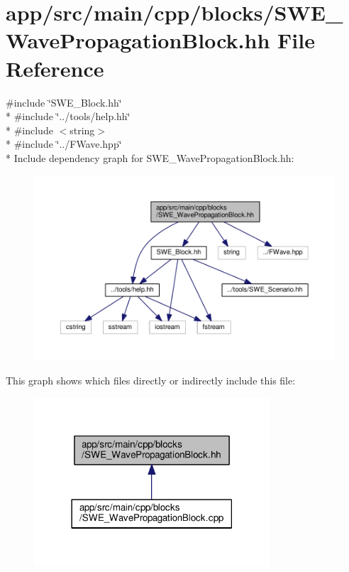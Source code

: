 \hypertarget{SWE__WavePropagationBlock_8hh}{}\section{app/src/main/cpp/blocks/\+S\+W\+E\+\_\+\+Wave\+Propagation\+Block.hh File Reference}
\label{SWE__WavePropagationBlock_8hh}
{\ttfamily \#include \char`\"{}S\+W\+E\+\_\+\+Block.\+hh\char`\"{}}\\*
{\ttfamily \#include \char`\"{}../tools/help.\+hh\char`\"{}}\\*
{\ttfamily \#include $<$string$>$}\\*
{\ttfamily \#include \char`\"{}../\+F\+Wave.\+hpp\char`\"{}}\\*
Include dependency graph for S\+W\+E\+\_\+\+Wave\+Propagation\+Block.\+hh\+:\nopagebreak
\begin{figure}[H]
\begin{center}
\leavevmode
\includegraphics[width=350pt]{SWE__WavePropagationBlock_8hh__incl}
\end{center}
\end{figure}
This graph shows which files directly or indirectly include this file\+:\nopagebreak
\begin{figure}[H]
\begin{center}
\leavevmode
\includegraphics[width=249pt]{SWE__WavePropagationBlock_8hh__dep__incl}
\end{center}
\end{figure}
